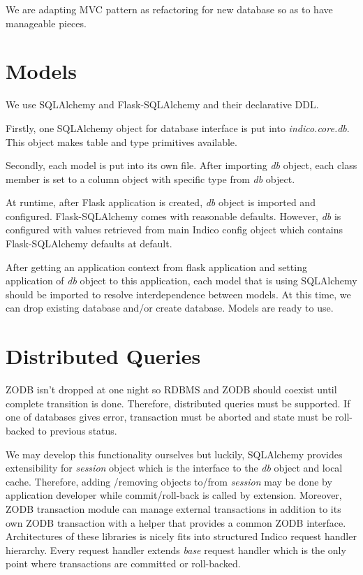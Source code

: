 We are adapting MVC pattern as refactoring for new database so as to have manageable pieces.

\section{Models}

We use SQLAlchemy and Flask-SQLAlchemy and their declarative DDL. 

Firstly, one SQLAlchemy object for database interface is put into \textit{indico.core.db}. This object makes table and type primitives available.

Secondly, each model is put into its own file. After importing \textit{db} object, each class member is set to  a column object with specific type from \textit{db} object.

At runtime, after Flask application is created, \textit{db} object is imported and configured. Flask-SQLAlchemy comes with reasonable defaults. However, \textit{db} is configured with values retrieved from main Indico config object which contains Flask-SQLAlchemy defaults at default.

After getting an application context from flask application and setting application of \textit{db} object to this application, each model that is using SQLAlchemy should  be imported to resolve interdependence between models. At this time, we can drop existing database and/or create database. Models are ready to use.

\section{Distributed Queries}

ZODB isn't dropped at one night so RDBMS and ZODB should coexist until complete transition is done. Therefore, distributed queries must be supported. If one of databases gives error, transaction must be aborted and state must be roll-backed to previous status.

We may develop this functionality ourselves but luckily, SQLAlchemy provides extensibility for \textit{session} object which is the interface to the \textit{db} object and local cache. Therefore, adding /removing objects to/from \textit{session} may be done by application developer while commit/roll-back is called by extension. Moreover, ZODB transaction module can manage external transactions in addition to its own ZODB transaction with a helper that provides a common ZODB interface. Architectures of these libraries is nicely fits into structured Indico request handler hierarchy. Every request handler extends \textit{base} request handler which is the only point where transactions are committed or roll-backed.

